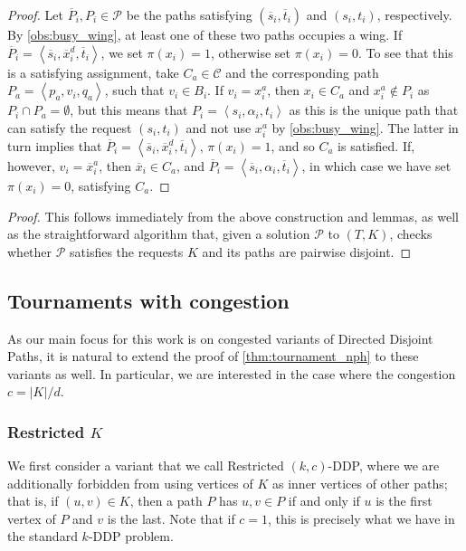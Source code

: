 \documentclass[a4paper,UKenglish,cleveref, autoref, thm-restate]{lipics-v2021}
\newcommand{\angled}[1]{\left\langle{#1}\right\rangle}
\newcommand{\pname}[1]{{\sc #1}}
\newcommand{\ol}[1]{\overline{#1}}
\newcommand{\congestion}{c}
\begin{document}
  \begin{proof}
    Let $\ol{P}_i, P_i \in \mathcal{P}$ be the paths satisfying $(\ol{s}_i, \ol{t}_i)$ and
    $(s_i, t_i)$, respectively.
    By \autoref{obs:busy_wing}, at least one of these two paths occupies a wing.
    If $\ol{P}_i = \angled{\ol{s}_i, \ol{x}^d_i, \ol{t}_i}$, we set $\pi(x_i) = 1$,
    otherwise set $\pi(x_i) = 0$.
    To see that this is a satisfying assignment, take $C_a \in \mathcal{C}$ and the
    corresponding path $P_a = \angled{p_a, v_i, q_a}$, such that $v_i \in B_i$.
    If $v_i = x_i^a$, then $x_i \in C_a$ and $x_i^a \notin P_i$ as $P_i \cap P_a =
    \emptyset$, but this means that $P_i = \angled{s_i, \alpha_i, t_i}$ as this is the unique
    path that can satisfy the request $(s_i, t_i)$ and not use $x_i^a$ by \autoref{obs:busy_wing}.
    The latter in turn implies that $\ol{P}_i = \angled{\ol{s}_i, \ol{x}^d_i, \ol{t}_i}$,
    $\pi(x_i) = 1$, and so $C_a$ is satisfied.
    If, however, $v_i = \ol{x}^a_i$, then $\ol{x}_i \in C_a$, and $\ol{P}_i =
    \angled{\ol{s}_i, \alpha_i, \ol{t}_i}$, in which case we have set $\pi(x_i) = 0$,
    satisfying $C_a$.
  \end{proof}

  \tournamentnph*

  \begin{proof}
    This follows immediately from the above construction and lemmas, as well as the
    straightforward algorithm that, given a solution $\mathcal{P}$ to $(T,K)$, checks
    whether $\mathcal{P}$ satisfies the requests $K$ and its paths are pairwise disjoint.
  \end{proof}

  \subsection{Tournaments with congestion}

  As our main focus for this work is on congested variants of \pname{Directed Disjoint
  Paths}, it is natural to extend the proof of \autoref{thm:tournament_nph} to these
  variants as well. In particular, we are interested in the case where the congestion $\congestion = |K|/d$.

  \subsubsection{Restricted $K$}

  We first consider a variant that we call \pname{Restricted $(k,c)$-DDP}, where we are additionally forbidden from using vertices of $K$ as inner
  vertices of other paths; that is, if $(u,v) \in K$, then a path $P$ has $u,v \in P$ if and
  only if $u$ is the first vertex of $P$ and $v$ is the last. Note that if $\congestion = 1$,
  this is precisely what we have in the standard \pname{$k$-DDP} problem.
\end{document}

